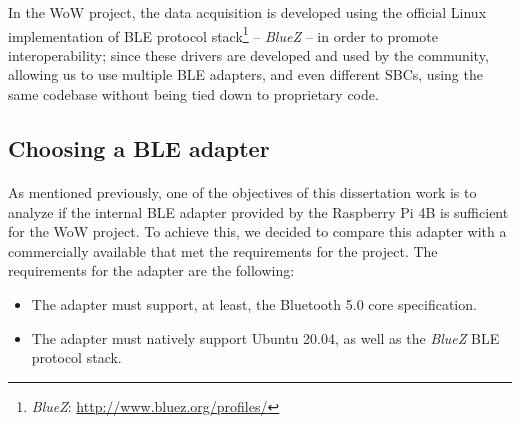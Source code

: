 In the \acs{WoW} project, the data acquisition is developed using the official Linux implementation of \acs{BLE} protocol stack\footnote{\textit{BlueZ}: \url{http://www.bluez.org/profiles/}} -- \textit{BlueZ} -- in order to promote interoperability; since these drivers are developed and used by the community, allowing us to use multiple \acs{BLE} adapters, and even different \acs{SBC}s, using the same codebase without being tied down to proprietary code. 




\subsection{Choosing a \acs{BLE} adapter} 

\paragraph{} As mentioned previously, one of the objectives of this dissertation work is to analyze if the internal \acs{BLE} adapter provided by the Raspberry Pi 4B is sufficient for the \acs{WoW} project. To achieve this, we decided to compare this adapter with a commercially available that met the requirements for the project. The requirements for the adapter are the following:

\begin{itemize}
    \item The adapter must support, at least, the Bluetooth 5.0 core specification.
    \item The adapter must natively support Ubuntu 20.04, as well as the \textit{BlueZ} \acs{BLE} protocol stack. 
\end{itemize}

